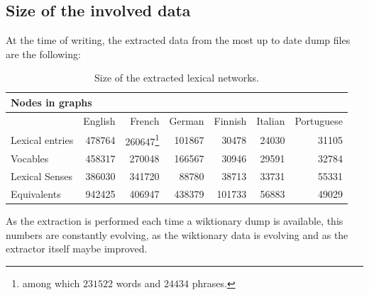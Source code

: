 \documentclass[10pt, a4paper]{article}
\begin{document}
\subsection{Size of the involved data}

At the time of writing, the extracted data from the most up to date dump files are the following:

\begin{table}[htb]
\begin{minipage}{\linewidth}
\begin{tabular}{lrrrrrr}
\multicolumn{4}{l}{\textbf{Nodes in graphs}}\\
\hline
				 & English &  French  & German & Finnish & Italian & Portuguese \\
Lexical entries &  478764 &  260647\footnote{among which $231522$ words and $24434$ phrases.}  
				 					   & 101867  &  30478 & 24030   & 31105         \\
Vocables 	     & 458317  & 270048  & 166567   & 30946 & 29591  &  32784    \\
Lexical Senses
			     & 386030  & 341720  & 88780   & 38713   &  33731  & 55331      \\
Equivalents
			     & 942425  & 406947 & 438379  & 101733 & 56883   & 49029       \\
\end{tabular}
\end{minipage}
\caption{Size of the extracted lexical networks.}
\label{table:size}
\end{table}

As the extraction is performed each time a wiktionary dump is available, this numbers are constantly evolving, as the wiktionary data is evolving and as the extractor itself maybe improved.
\end{document}
